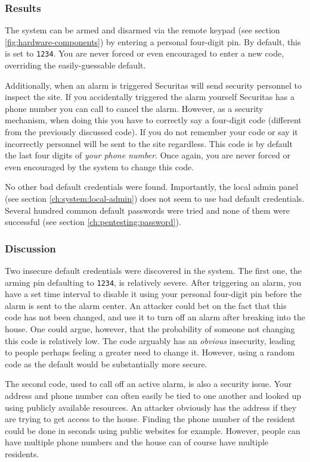 \subsubsection{Results}
The system can be armed and disarmed via the remote keypad (see section \ref{fig:hardware-components}) by entering a personal four-digit pin. By default, this is set to \texttt{1234}. You are never forced or even encouraged to enter a new code, overriding the easily-guessable default.

Additionally, when an alarm is triggered Securitas will send security personnel to inspect the site. If you accidentally triggered the alarm yourself Securitas has a phone number you can call to cancel the alarm. However, as a security mechanism, when doing this you have to correctly say a four-digit code (different from the previously discussed code). If you do not remember your code or say it incorrectly personnel will be sent to the site regardless. This code is by default the last four digits of \textit{your phone number}. Once again, you are never forced or even encouraged by the system to change this code.

No other bad default credentials were found. Importantly, the local admin panel (see section \ref{ch:system:local-admin}) does not seem to use bad default credentials. Several hundred common default passwords were tried and none of them were successful (see section \ref{ch:pentesting:password}).

\subsubsection{Discussion}
Two insecure default credentials were discovered in the system. The first one, the arming pin defaulting to \texttt{1234}, is relatively severe. After triggering an alarm, you have a set time interval to disable it using your personal four-digit pin before the alarm is sent to the alarm center. An attacker could bet on the fact that this code has not been changed, and use it to turn off an alarm after breaking into the house. One could argue, however, that the probability of someone not changing this code is relatively low. The code arguably has an \textit{obvious} insecurity, leading to people perhaps feeling a greater need to change it. However, using a random code as the default would be substantially more secure.

The second code, used to call off an active alarm, is also a security issue. Your address and phone number can often easily be tied to one another and looked up using publicly available resources. An attacker obviously has the address if they are trying to get access to the house. Finding the phone number of the resident could be done in seconds using public websites for example. However, people can have multiple phone numbers and the house can of course have multiple residents.

